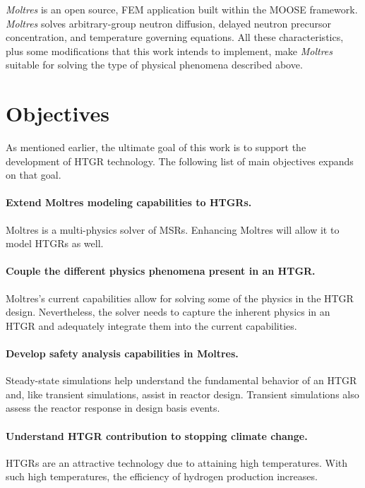 \textit{Moltres} is an open source, \gls{FEM} application built within the \gls{MOOSE} framework.
\textit{Moltres} solves arbitrary-group neutron diffusion, delayed neutron precursor concentration, and temperature governing equations.
All these characteristics, plus some modifications that this work intends to implement, make \textit{Moltres} suitable for solving the type of physical phenomena described above.

\section{Objectives}

As mentioned earlier, the ultimate goal of this work is to support the development of \gls{HTGR} technology.
The following list of main objectives expands on that goal.

\paragraph{Extend Moltres modeling capabilities to \glspl{HTGR}.}
Moltres is a multi-physics solver of \glspl{MSR}.
Enhancing Moltres will allow it to model \glspl{HTGR} as well.

\paragraph{Couple the different physics phenomena present in an HTGR.}
Moltres's current capabilities allow for solving some of the physics in the HTGR design.
Nevertheless, the solver needs to capture the inherent physics in an HTGR and adequately integrate them into the current capabilities.

\paragraph{Develop safety analysis capabilities in Moltres.}
Steady-state simulations help understand the fundamental behavior of an HTGR and, like transient simulations, assist in reactor design. 
Transient simulations also assess the reactor response in design basis events.

\paragraph{Understand \gls{HTGR} contribution to stopping climate change.}
HTGRs are an attractive technology due to attaining high temperatures.
With such high temperatures, the efficiency of hydrogen production increases.

